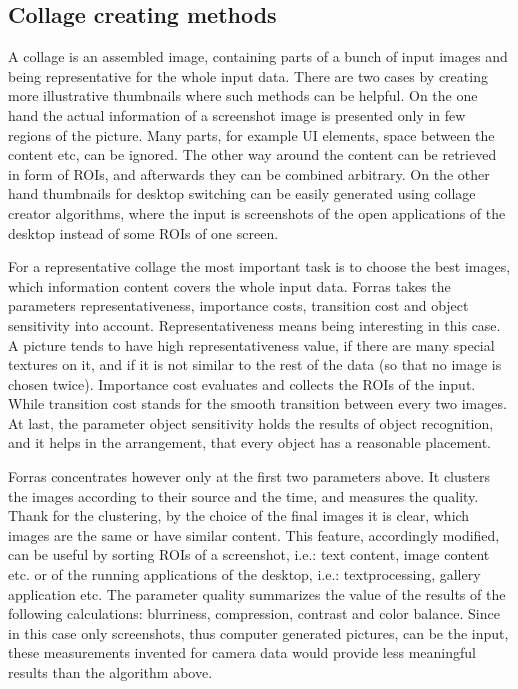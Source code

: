 \documentclass[draft,final]{vutinfth} %
\begin{document}
	\subsection{Collage creating methods} 
	A collage is an assembled image, containing parts of a bunch of input images and being representative for the whole input data.
	There are two cases by creating  more illustrative thumbnails where such methods can be helpful.
	On the one hand the actual information of a screenshot image is presented only in few regions of the picture.
	Many parts, for example UI elements, space between the content etc, can be ignored. 
	The other way around the content can be retrieved in form of ROIs, and afterwards they can be combined arbitrary.
	On the other hand thumbnails for desktop switching can be easily generated using collage creator algorithms, where the input is screenshots of the open applications of the desktop instead of some ROIs of one screen.\par
	For a representative collage the most important task is to choose the best images, which information content covers the whole input data.
	Forras takes the parameters representativeness, importance costs, transition cost and object sensitivity into account.
	Representativeness means being interesting in this case.
	A picture tends to have high representativeness value, if there are many special textures on it, and if it is not similar to the rest of the data (so that no image is chosen twice).
	Importance cost evaluates and collects the ROIs of the input.
	While transition cost stands for the smooth transition between every two images.
	At last, the parameter object sensitivity holds the results of object recognition, and it helps in the arrangement, that every object has a reasonable placement.\par
	Forras concentrates however only at the first two parameters above.
	It clusters the images according to their source and the time, and measures the quality.
	Thank for the clustering, by the choice of the final images it is clear,  which images are the same or have similar content.
	This feature, accordingly modified, can be useful by sorting ROIs of a screenshot, i.e.: text content, image content etc. or of the running applications of the desktop, i.e.: textprocessing, gallery application etc.
	The parameter quality summarizes the value of the results of the following calculations: blurriness, compression, contrast and color balance.
	Since in this case only screenshots, thus computer generated pictures, can be the input, these measurements invented for camera data would provide less meaningful results than the algorithm above.\par 
\end{document}
